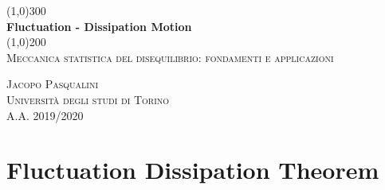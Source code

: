 \documentclass{article}
\begin{document}
\begin{titlepage}
	\begin{center}
	
	\line(1,0){300}\\
	[5mm]
	\huge{\bfseries Fluctuation - Dissipation Motion}\\
	[2mm]
	\line(1,0){200}\\
	[2cm]
	\textsc{\Large Meccanica statistica del disequilibrio: fondamenti e applicazioni} \\
	[8cm]
	
	\end{center}
	
	\begin{flushright}
	\textsc{\LARGE Jacopo Pasqualini}\\
	[0.5cm]
	\textsc{\large Università degli studi di Torino\\
	[0.5cm]
	A.A. 2019/2020 }
	\end{flushright}
	
\end{titlepage}

\section{Fluctuation Dissipation Theorem}\label{sec:langapp}



\end{document}
